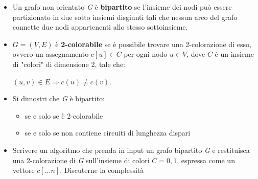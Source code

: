 \documentclass[../cheatSheetAlgoritmi.tex]{subfiles}
\begin{document}
\begin{itemize}
	\item Un grafo non orientato \textit{G} è \textbf{bipartito} se l’insieme dei nodi può essere partizionato in due sotto insiemi disgiunti tali che nessun arco del grafo connette due nodi appartenenti allo stesso sottoinsieme.
	\item $G = (V, E)$ è \textbf{2-colorabile} se è possibile trovare una 2-colorazione di esso, ovvero un assegnamento $c[u] \in C$ per ogni nodo $u \in V$, dove $C$ è un insieme di "colori" di dimensione 2, tale che: 

	\begin{center}
		$(u, v) \in E \Rightarrow c(u) \neq c(v)$.
	\end{center}

	\item Si dimostri che \textit{G} è bipartito:
	
	\begin{itemize}
		\item se e solo se è 2-colorabile
		\item se e solo se non contiene circuiti di lunghezza dispari
	\end{itemize}
	\item Scrivere un algoritmo che prenda in input un grafo bipartito \textit{G} e restituisca una 2-colorazione di \textit{G} sull’insieme di colori $C = {0,1}$, espressa come un vettore $c[...n]$. Discuterne la complessità
\end{itemize}
\end{document}
